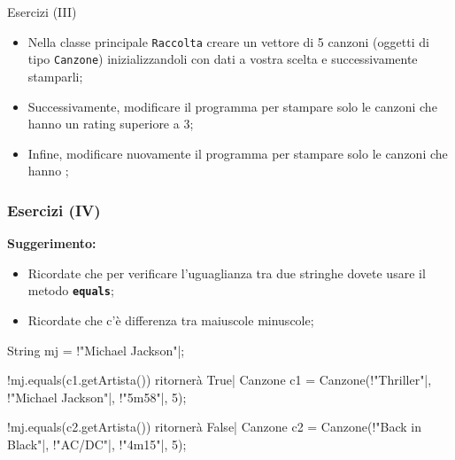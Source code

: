 \begin{frame}{Esercizi (III)}

  \begin{itemize}
   \item Nella classe principale \texttt{Raccolta} creare un vettore di 5 canzoni (oggetti di tipo \texttt{Canzone})
   inizializzandoli con dati a vostra scelta e successivamente stamparli;
   \item Successivamente, modificare il programma per stampare solo le canzoni che hanno un rating superiore a 3;
   \item Infine, modificare nuovamente il programma per stampare solo le canzoni che hanno \texttt{};
  \end{itemize}

\end{frame}

\begin{frame}[fragile]\frametitle{Esercizi (IV)}
  
  \textbf{Suggerimento:}
  \begin{itemize}
   \item Ricordate che per verificare l'uguaglianza tra due stringhe dovete usare il metodo \texttt{\textbf{equals}};
   \item Ricordate che c'è differenza tra maiuscole minuscole;
  \end{itemize}
  \begin{JavaCodePlain}[commandchars=\\!|]
  
  String mj = \String!"Michael Jackson"|;
  
  \Jcomment!mj.equals(c1.getArtista()) ritornerà True|
  Canzone c1 = \Jnew Canzone(\String!"Thriller"|, \String!"Michael Jackson"|,
                           \String!"5m58"|, 5);
  
  \Jcomment!mj.equals(c2.getArtista()) ritornerà False|
  Canzone c2 = \Jnew Canzone(\String!"Back in Black"|, \String!"AC/DC"|,
                           \String!"4m15"|, 5);
  \end{JavaCodePlain}

\end{frame}

